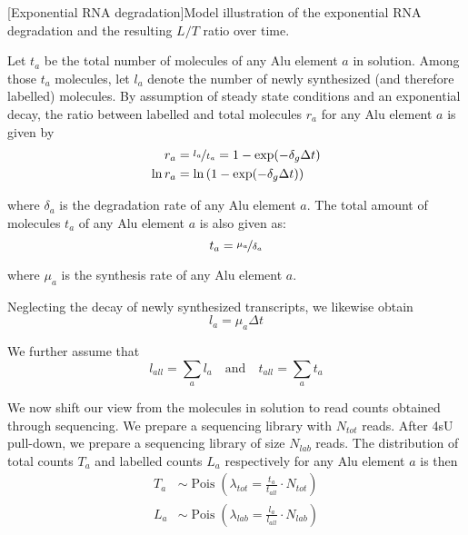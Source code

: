 \bigbreak
\noindent\begin{minipage}{\textwidth}
\centering

\vspace{-\ht\strutbox}
[Exponential RNA degradation]{Model illustration of the
exponential RNA degradation and the resulting $L/T$ ratio over time.}
\label{fig:expdecay}
\end{minipage}
\bigbreak

\noindent Let $t_{a}$ be the total number of molecules of any Alu element $a$ in
solution. Among those $t_{a}$ molecules, let $l_{a}$ denote the number of newly
synthesized (and therefore labelled) molecules. By assumption of steady state
conditions and an exponential decay, the ratio between labelled and total
molecules $r_{a}$ for any Alu element $a$ is given by
\begin{align*}
  r_{a}     &= \nicefrac{l_{a}}{t_{a}}=1-\exp(-\delta_{g}\Delta t)
\\ \ln r_{a} &= \ln\left(1-\exp(-\delta_{g}\Delta t)\right)
\end{align*}

\noindent where $\delta_{a}$ is the degradation rate of any Alu element $a$. The
total amount of molecules $t_{a}$ of any Alu element $a$ is also given as:
\begin{equation*}
t_{a}=\nicefrac{\mu_{a}}{\delta_{a}}
\end{equation*}

\noindent where $\mu_{a}$ is the synthesis rate of any Alu element $a$.

\noindent{}Neglecting the
decay of newly synthesized transcripts, we likewise obtain
\begin{equation*}
l_{a}=\mu_{a}\Delta t
\end{equation*}

\noindent We further assume that
\begin{equation*}
l_{all}=\sum_{a}l_{a}\quad\text{and}\quad t_{all}=\sum_{a}t_{a}
\end{equation*}

\noindent We now shift our view from the molecules in solution to read counts
obtained through sequencing. We prepare a sequencing library with $N_{tot}$
reads. After 4sU pull-down, we prepare a sequencing library of size $N_{lab}$
reads. The distribution of total counts $T_{a}$ and labelled counts $L_{a}$
respectively for any Alu element $a$ is then
\begin{align*}
  T_{a} &\sim \operatorname{Pois}
  (\lambda_{tot}=\frac{t_{a}}{t_{all}}\cdot N_{tot})
\\ L_{a} &\sim \operatorname{Pois}
  (\lambda_{lab}=\frac{l_{a}}{l_{all}}\cdot N_{lab})
\end{align*}


